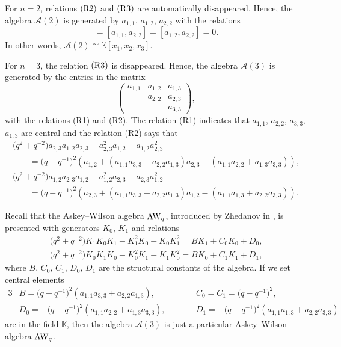 \documentclass[pdftex]{sigma}
\numberwithin{equation}{section}
\def\lrb#1{\left(#1\right)}
\def\K{\mathbb{K}}
\def\A{\mathscr{A}}
\begin{document}
\begin{Remark}\label{remark}
For $n=2$, relations ${\rm (R2)}$ and ${\rm (R3)}$ are automatically disappeared.
Hence, the algebra $\A(2)$ is generated by $a_{1,1}$, $ a_{1,2}$, $a_{2,2}$ with the relations
\begin{equation*}
[a_{1,1},a_{1,2}]=[a_{1,1},a_{2,2}]=[a_{1,2},a_{2,2}]=0.
\end{equation*}
In other words, $\A(2)\cong \K[x_1, x_2, x_3].$

For $n=3$, the relation ${\rm (R3)}$ is disappeared.
Hence, the algebra $\A(3)$ is generated by the entries in the matrix
\begin{equation*}
\begin{pmatrix}
a_{1,1}& a_{1,2}&a_{1,3}\\
& a_{2,2}&a_{2,3}\\
& &a_{3,3}
\end{pmatrix}
,
\end{equation*}
with the relations {\rm (R1)} and {\rm (R2)}.
The relation {\rm (R1)} indicates that $a_{1,1}$, $a_{2,2}$, $a_{3,3}$, $a_{1,3}$ are central and the relation {\rm (R2)} says that
\begin{gather*}
\bigl(q^2+q^{-2}\bigr)a_{2,3}a_{1,2}a_{2,3}-a_{2,3}^2a_{1,2}-a_{1,2}a_{2,3}^2 \\
\qquad=\bigl(q-q^{-1}\bigr)^2 (a_{1, 2}+\lrb{a_{1, 1}a_{3, 3} + a_{2, 2 }a_{1, 3}} a_{2, 3} -\lrb{a_{1, 1}a_{2, 2}+a_{1, 3}a_{3, 3}}),\\
\bigl(q^2+q^{-2}\bigr)a_{1,2}a_{2,3}a_{1,2}-a_{1,2}^2a_{2,3}-a_{2,3}a_{1,2}^2 \\
\qquad=\bigl(q-q^{-1}\bigr)^2 (a_{2, 3}+ \lrb{a_{1, 1}a_{3, 3} + a_{2, 2 }a_{1, 3}}a_{1, 2}-\lrb{a_{1, 1}a_{1, 3}+a_{2, 2}a_{3, 3}}).
\end{gather*}
\end{Remark}
Recall that the Askey--Wilson algebra ${\rm AW}_q$, introduced by Zhedanov in \cite{Zhe(1991)}, is presented with generators $K_0$, $K_1$ and relations
\begin{gather*}
\bigl(q^2+q^{-2}\bigr)K_1K_0K_1-K_1^2K_0-K_0K_1^2=BK_1+C_0K_0+D_0,\\
\bigl(q^2+q^{-2}\bigr)K_0K_1K_0-K_0^2K_1-K_1K_0^2=BK_0+C_1K_1+D_1,
\end{gather*}
where $B$, $C_0$, $C_1$, $D_0$, $D_1$ are the structural constants of the algebra.
If we set central elements
\begin{alignat*}{3}
& B=\bigl(q-q^{-1}\bigr)^2\lrb{a_{1, 1}a_{3, 3} + a_{2, 2 }a_{1, 3}}, \qquad && C_0=C_1=\bigl(q-q^{-1}\bigr)^2, & \\
& D_0=-\bigl(q-q^{-1}\bigr)^2\lrb{a_{1, 1}a_{2, 2}+a_{1, 3}a_{3, 3}}, \qquad&&
D_1=-\bigl(q-q^{-1}\bigr)^2\lrb{a_{1, 1}a_{1, 3}+a_{2, 2}a_{3, 3}}&
\end{alignat*}
are in the field $\K$, then the algebra $\A(3)$ is just a particular Askey--Wilson algebra ${\rm AW}_q$.
\end{document}
